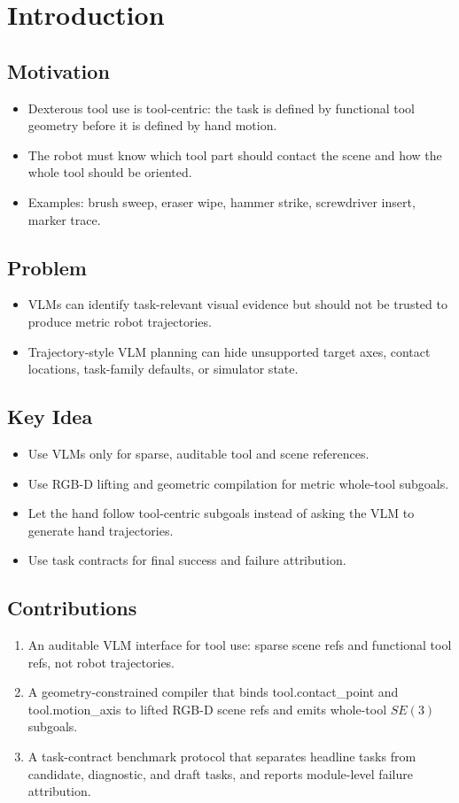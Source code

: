 \documentclass[journal]{IEEEtran}
\begin{document}
\section{Introduction}
\subsection{Motivation}
\begin{itemize}
  \item Dexterous tool use is tool-centric: the task is defined by functional
  tool geometry before it is defined by hand motion.
  \item The robot must know which tool part should contact the scene and how
  the whole tool should be oriented.
  \item Examples: brush sweep, eraser wipe, hammer strike, screwdriver insert,
  marker trace.
\end{itemize}

\subsection{Problem}
\begin{itemize}
  \item VLMs can identify task-relevant visual evidence but should not be
  trusted to produce metric robot trajectories.
  \item Trajectory-style VLM planning can hide unsupported target axes, contact
  locations, task-family defaults, or simulator state.
\end{itemize}

\subsection{Key Idea}
\begin{itemize}
  \item Use VLMs only for sparse, auditable tool and scene references.
  \item Use RGB-D lifting and geometric compilation for metric whole-tool
  subgoals.
  \item Let the hand follow tool-centric subgoals instead of asking the VLM to
  generate hand trajectories.
  \item Use task contracts for final success and failure attribution.
\end{itemize}

\subsection{Contributions}
\begin{enumerate}
  \item An auditable VLM interface for tool use: sparse scene refs and
  functional tool refs, not robot trajectories.
  \item A geometry-constrained compiler that binds tool.contact\_point and
  tool.motion\_axis to lifted RGB-D scene refs and emits whole-tool $SE(3)$
  subgoals.
  \item A task-contract benchmark protocol that separates headline tasks from
  candidate, diagnostic, and draft tasks, and reports module-level failure
  attribution.
\end{enumerate}
\end{document}
